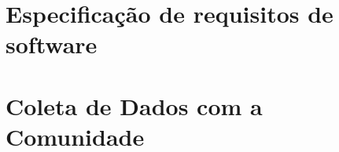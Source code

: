 \documentclass[
    12pt,
    oneside,            %
    a4paper,
    brazilian
    ]{abntex2}
\begin{document}



\postextual



%
%


\begin{apendicesenv}


	\chapter{Especificação de requisitos de software}
	\label{ap:requisitos}
	

	\chapter{Coleta de Dados com a Comunidade}
	

\end{apendicesenv}


\end{document}
